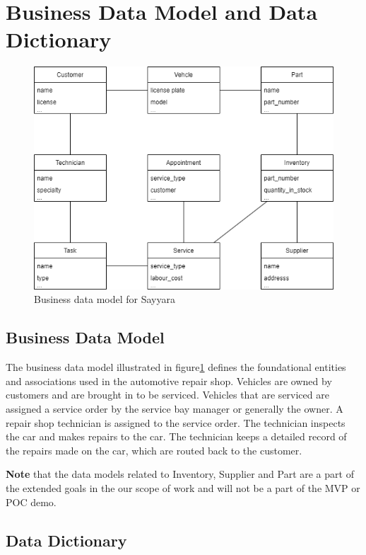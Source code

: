 \documentclass[12pt]{article}
\begin{document}
\section{Business Data Model and Data Dictionary}

\begin{figure}[H]
    \centering
    \includegraphics[scale=0.7]{dmd.drawio}
    \caption{Business data model for Sayyara}
    \label{fig:bdm}
\end{figure}

\subsection{Business Data Model}
The business data model illustrated in figure\ref{fig:bdm} defines the foundational entities and associations used in the automotive repair shop. Vehicles are owned by customers and are brought in to be serviced. Vehicles that are serviced are assigned a service order by the service bay manager or generally the owner. A repair shop technician is assigned to the service order. The technician inspects the car and makes repairs to the car. The technician keeps a detailed record of the repairs made on the car, which are routed back to the customer.

\textbf{Note} that the data models related to Inventory, Supplier and Part are a part of the extended goals in the our scope of work and will not be a part of the MVP or POC demo.
\pagebreak
\subsection{Data Dictionary}
\end{document}
